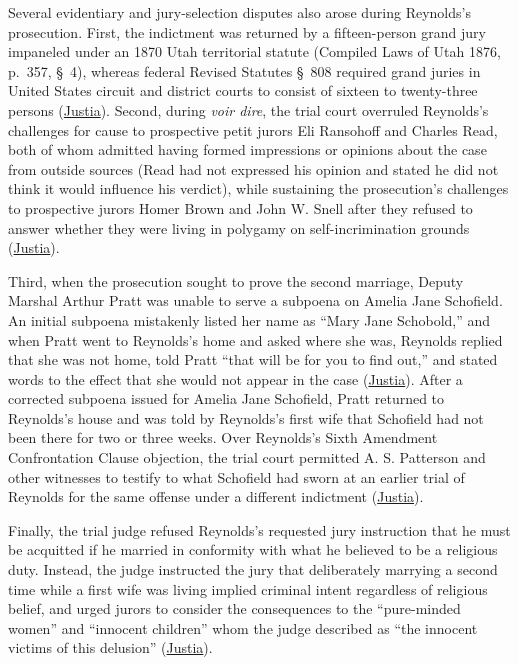 \documentclass[12pt]{article}
\begin{document}
Several evidentiary and jury-selection disputes also arose during Reynolds's prosecution. First, the indictment was returned by a fifteen-person grand jury impaneled under an 1870 Utah territorial statute (Compiled Laws of Utah 1876, p.~357, \S~4), whereas federal Revised Statutes \S~808 required grand juries in United States circuit and district courts to consist of sixteen to twenty-three persons (\href{https://supreme.justia.com/cases/federal/us/98/145/}{Justia}). Second, during \textit{voir dire}, the trial court overruled Reynolds's challenges for cause to prospective petit jurors Eli Ransohoff and Charles Read, both of whom admitted having formed impressions or opinions about the case from outside sources (Read had not expressed his opinion and stated he did not think it would influence his verdict), while sustaining the prosecution's challenges to prospective jurors Homer Brown and John W. Snell after they refused to answer whether they were living in polygamy on self-incrimination grounds (\href{https://supreme.justia.com/cases/federal/us/98/145/}{Justia}).

Third, when the prosecution sought to prove the second marriage, Deputy Marshal Arthur Pratt was unable to serve a subpoena on Amelia Jane Schofield. An initial subpoena mistakenly listed her name as ``Mary Jane Schobold,'' and when Pratt went to Reynolds's home and asked where she was, Reynolds replied that she was not home, told Pratt ``that will be for you to find out,'' and stated words to the effect that she would not appear in the case (\href{https://supreme.justia.com/cases/federal/us/98/145/}{Justia}). After a corrected subpoena issued for Amelia Jane Schofield, Pratt returned to Reynolds's house and was told by Reynolds's first wife that Schofield had not been there for two or three weeks. Over Reynolds's Sixth Amendment Confrontation Clause objection, the trial court permitted A. S. Patterson and other witnesses to testify to what Schofield had sworn at an earlier trial of Reynolds for the same offense under a different indictment (\href{https://supreme.justia.com/cases/federal/us/98/145/}{Justia}).

Finally, the trial judge refused Reynolds's requested jury instruction that he must be acquitted if he married in conformity with what he believed to be a religious duty. Instead, the judge instructed the jury that deliberately marrying a second time while a first wife was living implied criminal intent regardless of religious belief, and urged jurors to consider the consequences to the ``pure-minded women'' and ``innocent children'' whom the judge described as ``the innocent victims of this delusion'' (\href{https://supreme.justia.com/cases/federal/us/98/145/}{Justia}).
\end{document}
